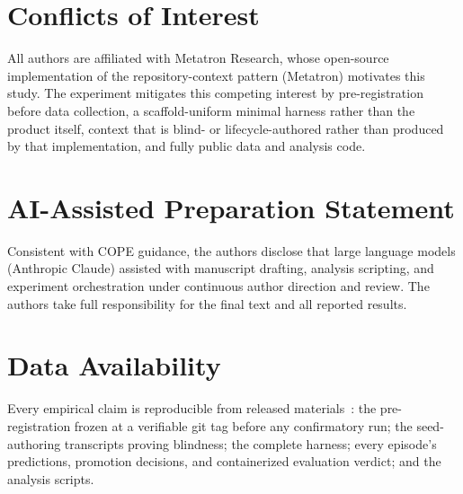 \documentclass[sigconf,nonacm]{acmart}
\begin{document}
\section*{Conflicts of Interest}
All authors are affiliated with Metatron Research, whose open-source
implementation of the repository-context pattern (Metatron) motivates this study.
The experiment mitigates this competing interest by pre-registration before data
collection, a scaffold-uniform minimal harness rather than the product itself,
context that is blind- or lifecycle-authored rather than produced by that
implementation, and fully public data and analysis code.

\section*{AI-Assisted Preparation Statement}
Consistent with COPE guidance, the authors disclose that large language models
(Anthropic Claude) assisted with manuscript drafting, analysis scripting, and
experiment orchestration under continuous author direction and review. The authors
take full responsibility for the final text and all reported results.

\section*{Data Availability}
Every empirical claim is reproducible from released materials~\cite{artifact}: the
pre-registration frozen at a verifiable git tag before any confirmatory run; the
seed-authoring transcripts proving blindness; the complete harness; every
episode's predictions, promotion decisions, and containerized evaluation verdict;
and the analysis scripts.
\end{document}
